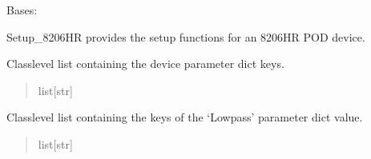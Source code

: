 \documentclass[letterpaper,10pt,english]{sphinxmanual}
\begin{document}
\begin{fulllineitems}
\label{\detokenize{Setup_8206HR:Setup_8206HR.Setup_8206HR}}
\pysigstartsignatures
{}
\pysigstopsignatures
\sphinxAtStartPar
Bases: {\hyperref[\detokenize{Setup_PodInterface:Setup_PodInterface.Setup_Interface}]{}}

\sphinxAtStartPar
Setup\_8206HR provides the setup functions for an 8206\sphinxhyphen{}HR POD device.

\begin{fulllineitems}
\label{\detokenize{Setup_8206HR:Setup_8206HR.Setup_8206HR._PARAMKEYS}}
\pysigstartsignatures
{}
\pysigstopsignatures
\sphinxAtStartPar
Class\sphinxhyphen{}level list containing the device parameter dict keys.
\begin{quote}\begin{description}
\sphinxAtStartPar
list{[}str{]}

\end{description}\end{quote}

\end{fulllineitems}


\begin{fulllineitems}
\label{\detokenize{Setup_8206HR:Setup_8206HR.Setup_8206HR._LOWPASSKEYS}}
\pysigstartsignatures
{}
\pysigstopsignatures
\sphinxAtStartPar
Class\sphinxhyphen{}level list containing the keys of the ‘Low\sphinxhyphen{}pass’ parameter             dict value.
\begin{quote}\begin{description}
\sphinxAtStartPar
list{[}str{]}

\end{description}\end{quote}

\end{fulllineitems}


\end{fulllineitems}
\end{document}
